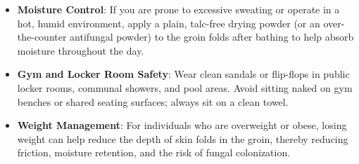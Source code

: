 \begin{itemize}
    \item \textbf{Moisture Control}: If you are prone to excessive sweating or operate in a hot, humid environment, apply a plain, talc-free drying powder (or an over-the-counter antifungal powder) to the groin folds after bathing to help absorb moisture throughout the day.
    \item \textbf{Gym and Locker Room Safety}: Wear clean sandals or flip-flops in public locker rooms, communal showers, and pool areas. Avoid sitting naked on gym benches or shared seating surfaces; always sit on a clean towel.
    \item \textbf{Weight Management}: For individuals who are overweight or obese, losing weight can help reduce the depth of skin folds in the groin, thereby reducing friction, moisture retention, and the risk of fungal colonization.
\end{itemize}

